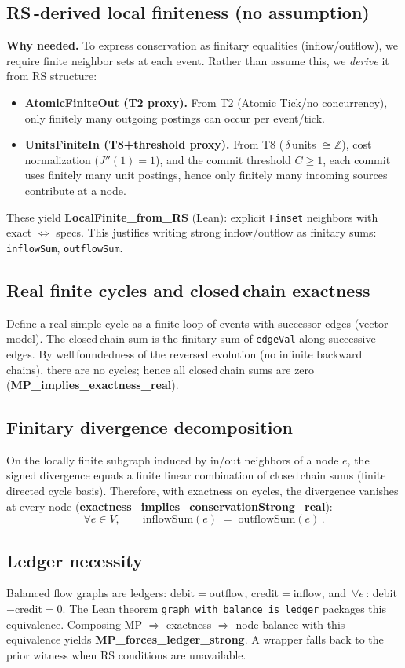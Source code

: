 \documentclass[11pt]{article}
\begin{document}
\subsection*{RS\,-derived local finiteness (no assumption)}
\textbf{Why needed.} To express conservation as finitary equalities (inflow/outflow), we require finite neighbor sets at each event. Rather than assume this, we \emph{derive} it from RS structure:
\begin{itemize}[leftmargin=*]
  \item \textbf{AtomicFiniteOut (T2 proxy).} From T2 (Atomic Tick/no concurrency), only finitely many outgoing postings can occur per event/tick.
  \item \textbf{UnitsFiniteIn (T8+threshold proxy).} From T8 (\,$\delta$\,units $\cong \mathbb Z$), cost normalization ($J''(1){=}1$), and the commit threshold $C\ge 1$, each commit uses finitely many unit postings, hence only finitely many incoming sources contribute at a node.
\end{itemize}
These yield \textbf{LocalFinite\_from\_RS} (Lean): explicit \texttt{Finset} neighbors with exact $\Leftrightarrow$ specs. This justifies writing strong inflow/outflow as finitary sums: \texttt{inflowSum}, \texttt{outflowSum}.

\subsection*{Real finite cycles and closed\,chain exactness}
Define a real simple cycle as a finite loop of events with successor edges (vector model). The closed\,chain sum is the finitary sum of \texttt{edgeVal} along successive edges. By well\,foundedness of the reversed evolution (no infinite backward chains), there are no cycles; hence all closed\,chain sums are zero (\textbf{MP\_implies\_exactness\_real}).

\subsection*{Finitary divergence decomposition}
On the locally finite subgraph induced by in/out neighbors of a node $e$, the signed divergence equals a finite linear combination of closed\,chain sums (finite directed cycle basis). Therefore, with exactness on cycles, the divergence vanishes at every node (\textbf{exactness\_implies\_conservationStrong\_real}):
\[
  \forall e\in V,\qquad \mathrm{inflowSum}(e) \;=\; \mathrm{outflowSum}(e)\,.
\]

\subsection*{Ledger necessity}
Balanced flow graphs are ledgers: debit$=$outflow, credit$=$inflow, and \,$\forall e$\,: debit$-$credit$=0$. The Lean theorem \texttt{graph\_with\_balance\_is\_ledger} packages this equivalence. Composing MP $\Rightarrow$ exactness $\Rightarrow$ node balance with this equivalence yields \textbf{MP\_forces\_ledger\_strong}. A wrapper falls back to the prior witness when RS conditions are unavailable.
\end{document}
